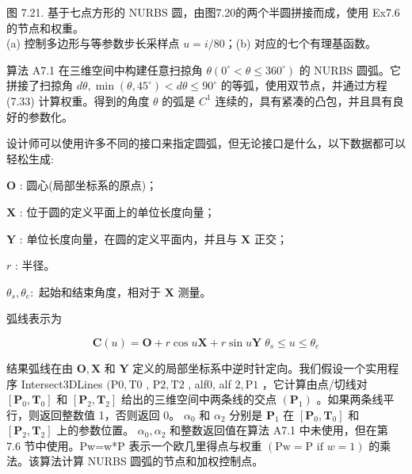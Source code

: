 \documentclass[../main.tex]{subfiles}
\begin{document}
\begin{center}
\begin{minipage}{32cm}
\vspace*{.6\baselineskip}
\centering
{}
\par\smallskip
图 7.21. 基于七点方形的 NURBS 圆，由图7.20的两个半圆拼接而成，使用 Ex7.6 的节点和权重。\\
(a) 控制多边形与等参数步长采样点 $u=i/80$；(b) 对应的七个有理基函数。
\end{minipage}
\end{center}

算法 A7.1 在三维空间中构建任意扫掠角 \(\theta \left( {{0}^{ \circ  } < \theta  \leq  {360}^{ \circ  }}\right)\) 的 NURBS 圆弧。它拼接了扫掠角 \({d\theta },\min \left( {\theta ,{45}^{ \circ  }}\right)  < {d\theta } \leq  {90}^{ \circ  }\) 的等弧，使用双节点，并通过方程 (7.33) 计算权重。得到的角度 \(\theta\) 的弧是 \({C}^{1}\) 连续的，具有紧凑的凸包，并且具有良好的参数化。



设计师可以使用许多不同的接口来指定圆弧，但无论接口是什么，以下数据都可以轻松生成:

\(\mathbf{O}\) : 圆心(局部坐标系的原点)；

\(\mathbf{X}\) : 位于圆的定义平面上的单位长度向量；

\(\mathbf{Y}\) : 单位长度向量，在圆的定义平面内，并且与 \(\mathbf{X}\) 正交；

\(r\) : 半径。

\({\theta }_{s},{\theta }_{e} :\) 起始和结束角度，相对于 \(\mathbf{X}\) 测量。



弧线表示为

\[
\mathbf{C}\left( u\right)  = \mathbf{O} + r\cos u\mathbf{X} + r\sin u\mathbf{Y}\;{\theta }_{s} \leq  u \leq  {\theta }_{e} \tag{7.36}
\]

结果弧线在由 \(\mathbf{O},\mathbf{X}\) 和 \(\mathbf{Y}\) 定义的局部坐标系中逆时针定向。我们假设一个实用程序 Intersect3DLines \((\mathrm{P}0,\mathrm{T}0\) , \(\mathrm{P}2,\mathrm{T}2\) , alf0, alf \(2,\mathrm{P}1\) ，它计算由点/切线对 \(\left\lbrack  {{\mathbf{P}}_{0},{\mathbf{T}}_{0}}\right\rbrack\) 和 \(\left\lbrack  {{\mathbf{P}}_{2},{\mathbf{T}}_{2}}\right\rbrack\) 给出的三维空间中两条线的交点 \(\left( {\mathbf{P}}_{1}\right)\) 。如果两条线平行，则返回整数值 1，否则返回 0。 \({\alpha }_{0}\) 和 \({\alpha }_{2}\) 分别是 \({\mathbf{P}}_{1}\) 在 \(\left\lbrack  {{\mathbf{P}}_{0},{\mathbf{T}}_{0}}\right\rbrack\) 和 \(\left\lbrack  {{\mathbf{P}}_{2},{\mathbf{T}}_{2}}\right\rbrack\) 上的参数位置。 \({\alpha }_{0},{\alpha }_{2}\) 和整数返回值在算法 A7.1 中未使用，但在第 7.6 节中使用。Pw=w*P 表示一个欧几里得点与权重 \(\left( {\mathrm{{Pw}} = \mathrm{P}\text{ if }w = 1}\right)\) 的乘法。该算法计算 NURBS 圆弧的节点和加权控制点。
\end{document}

